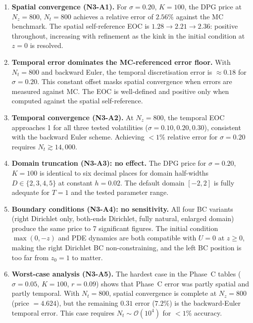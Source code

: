 \documentclass[11pt,a4paper]{article}
\newcommand{\Nz}{N_z}
\newcommand{\Nt}{N_t}
\newcommand{\bigo}[1]{\mathcal{O}(#1)}
\begin{document}
\begin{enumerate}
  \item \textbf{Spatial convergence (N3-A1).}
        For $\sigma = 0.20$, $K = 100$, the DPG price at $\Nz = 800$,
        $\Nt = 800$ achieves a relative error of $2.56\%$ against the
        MC benchmark.  The spatial self-reference EOC is
        $1.28 \to 2.21 \to 2.36$: positive throughout, increasing
        with refinement as the kink in the initial condition at $z = 0$
        is resolved.

  \item \textbf{Temporal error dominates the MC-referenced error
        floor.}  With $\Nt = 800$ and backward Euler, the temporal
        discretisation error is $\approx 0.18$ for $\sigma = 0.20$.
        This constant offset masks spatial convergence when errors
        are measured against MC.  The EOC is well-defined and positive
        only when computed against the spatial self-reference.

  \item \textbf{Temporal convergence (N3-A2).}
        At $\Nz = 800$, the temporal EOC approaches 1 for all three
        tested volatilities ($\sigma = 0.10, 0.20, 0.30$), consistent
        with the backward Euler scheme.  Achieving $< 1\%$ relative
        error for $\sigma = 0.20$ requires $\Nt \gtrsim 14{,}000$.

  \item \textbf{Domain truncation (N3-A3): no effect.}
        The DPG price for $\sigma = 0.20$, $K = 100$ is identical to
        six decimal places for domain half-widths $D \in \{2, 3, 4, 5\}$
        at constant $h = 0.02$.  The default domain $[-2, 2]$ is
        fully adequate for $T = 1$ and the tested parameter range.

  \item \textbf{Boundary conditions (N3-A4): no sensitivity.}
        All four BC variants (right Dirichlet only, both-ends Dirichlet,
        fully natural, enlarged domain) produce the same price to 7
        significant figures.  The initial condition $\max(0,-z)$ and
        PDE dynamics are both compatible with $U = 0$ at $z \ge 0$,
        making the right Dirichlet BC non-constraining, and the
        left BC position is too far from $z_0 = 1$ to matter.

  \item \textbf{Worst-case analysis (N3-A5).}
        The hardest case in the Phase~C tables ($\sigma = 0.05$, $K = 100$,
        $r = 0.09$) shows that Phase~C error was partly spatial and
        partly temporal.  With $\Nt = 800$, spatial convergence is
        complete at $\Nz = 800$ (price $= 4.624$), but the remaining
        $0.31$ error ($7.2\%$) is the backward-Euler temporal error.
        This case requires $\Nt \sim \bigo{10^4}$ for $< 1\%$ accuracy.
\end{enumerate}
\end{document}

